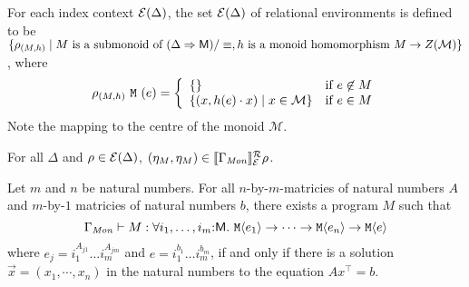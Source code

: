For each index context $\mathcal{E}(\Delta)$, the set
$\mathcal{E}(\Delta)$ of relational environments is defined to be $\{
\rho_{(M,h)} \mathrel| M\textrm{ is a submonoid of }(\Delta \Rightarrow
\mathsf{M})/\equiv, h\textrm{ is a monoid homomorphism }M \to
Z(\mathcal{M}) \}$, where
\begin{displaymath}
  \rho_{(M,h)}\ \texttt{M}\ (e) = \left\{
    \begin{array}{ll}
      \{ \} & \textrm{if}\ e\not\in M \\
      \{ (x, h(e)\cdot x) \mathrel| x \in \mathcal{M} \} & \textrm{if}\ e\in M
    \end{array}
  \right.
\end{displaymath}
Note the mapping to the centre of the monoid $\mathcal{M}$.

\begin{lemma}
  For all $\Delta$ and $\rho \in \mathcal{E}(\Delta)$,
  $(\eta_{M},\eta_{M}) \in \llbracket \Gamma_{\mathit{Mon}} \rrbracket^{\mathcal{R}}_{\mathcal{E}}{\rho}$.
\end{lemma}

\begin{theorem}
  Let $m$ and $n$ be natural numbers. For all $n$-by-$m$-matricies of
  natural numbers $A$ and $m$-by-$1$ matricies of natural numbers $b$,
  there exists a program $M$ such that
  \begin{equation}
    \label{eq:fo-monoid-type}
    \Gamma_{\mathit{Mon}} \vdash M : \forall i_1,\dots,i_m\mathord:\mathsf{M}.\ \textup{\texttt{M}}\langle e_1 \rangle \to \dots \to \textup{\texttt{M}}\langle e_n \rangle \to \textup{\texttt{M}}\langle e \rangle
  \end{equation}
  where $e_j = i_1^{A_{j1}}\dots i_m^{A_{jm}}$ and $e =
  i_1^{b_1}\dots i_m^{b_m}$, if and only if there is a solution
  $\vec{x} = (x_1,\cdots,x_n)$ in the natural numbers to the equation
  $A x^\top = b$.
\end{theorem}

